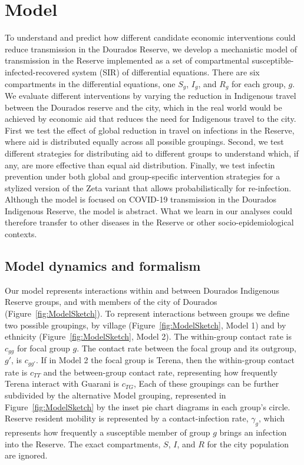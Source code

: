 \documentclass[
  letterpaper,
  abstract]{scrartcl}
\begin{document}
\section{Model}\label{sec:model}

To understand and predict how different candidate economic interventions could
reduce transmission in the Dourados Reserve, we develop a mechanistic model of
transmission in the Reserve implemented as a set of compartmental
susceptible-infected-recovered system (SIR) of differential equations.  There
are six compartments in the differential equations, one $S_g$, $I_g$, and $R_g$ for
each group, $g$.  We evaluate different interventions by varying the reduction in
Indigenous travel between the Dourados reserve and the city, which in the real
world would be achieved by economic aid that reduces the need for Indigenous
travel to the city. First we test the effect of global reduction in travel on
infections in the Reserve, where aid is distributed equally across all possible
groupings. Second, we test different strategies for distributing aid to
different groups to understand which, if any, are more effective than equal aid
distribution. Finally, we test infectin prevention under both global and
group-specific intervention strategies for a stylized version of the Zeta
variant that allows probabilistically for re-infection. Although the model is
focused on COVID-19 transmission in the Dourados Indigenous Reserve, the
model is abstract. What we learn in our analyses could therefore transfer to
other diseases in the Reserve or other socio-epidemiological contexts.


\subsection{Model dynamics and formalism}
\label{sub:modelDynamics}

Our model represents interactions within and between Dourados Indigenous 
Reserve groups, and with members of the city of Dourados 
(Figure~\ref{fig:ModelSketch}). To represent
interactions between groups we define two possible groupings, by village
(Figure~\ref{fig:ModelSketch}, Model 1) and by ethnicity
(Figure~\ref{fig:ModelSketch}, Model 2). The within-group contact rate 
is $c_{gg}$ for focal group $g$. The contact rate between the focal group and
its outgroup, $g'$, is $c_{gg'}$. If in Model 2 the focal group is Terena, then
the within-group contact rate is $c_{TT}$ and the between-group contact rate,
representing how frequently Terena interact with Guarani is $c_{TG}$, Each of these groupings can be further
subdivided by the alternative Model grouping, represented in 
Figure~\ref{fig:ModelSketch} by the inset pie chart diagrams in each group's
circle. Reserve resident mobility is represented by a contact-infection rate,
$\gamma_g$, which represents how frequently a susceptible member of group $g$
brings an infection into the Reserve. The exact compartments, $S$, $I$, and $R$
for the city population are ignored.
\end{document}
